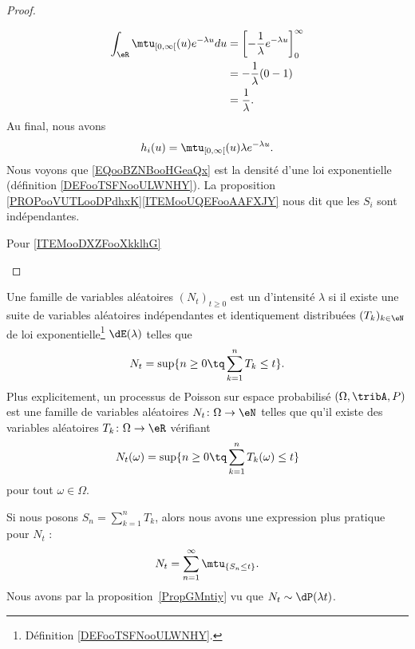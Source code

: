 \begin{proof}
\begin{subproof}
\begin{subequations}
\begin{align}
            \int_{\eR}\mtu_{\mathopen[ 0 , \infty \mathclose[}(u) e^{-\lambda u}du&=\left[ -\frac{1}{ \lambda } e^{-\lambda u} \right]_{0}^{\infty}\\
                    &=-\frac{1}{ \lambda }(0-1)\\
                    &=\frac{1}{ \lambda }.
        \end{align}
    \end{subequations}
    Au final, nous avons
    \begin{equation}        \label{EQooBZNBooHGeaQx}
        h_i(u)=\mtu_{\mathopen[ 0 , \infty \mathclose[}(u)\lambda  e^{-\lambda u}.
    \end{equation}
    \spitem[Conclusions]
    Nous voyons que \eqref{EQooBZNBooHGeaQx} est la densité d'une loi exponentielle (définition \ref{DEFooTSFNooULWNHY}). La proposition \ref{PROPooVUTLooDPdhxK}\ref{ITEMooUQEFooAAFXJY} nous dit que les \( S_i\) sont indépendantes.
    \end{subproof}


    \begin{center}
        Pour \ref{ITEMooDXZFooXkklhG}
    \end{center}
    

\end{proof}

\begin{definition}      \label{DEFooWXHEooEHQUJU}       
    Une famille de variables aléatoires \( (N_t)_{t\geq 0}\) est un  d'intensité \( \lambda\) si il existe une suite de variables aléatoires indépendantes et identiquement distribuées \( (T_k)_{k\in \eN}\) de loi exponentielle\footnote{Définition \ref{DEFooTSFNooULWNHY}.} \( \dE(\lambda)\) telles que
	\begin{equation}
		N_t=\sup\{ n\geq 0\tq \sum_{k=1}^nT_k\leq t \}.
	\end{equation}
    Plus explicitement, un processus de Poisson sur espace probabilisé \( (\Omega,\tribA,P)\) est une famille de variables aléatoires \( N_t\colon \Omega\to \eN\) telles que qu'il existe des variables aléatoires \( T_k\colon \Omega\to \eR\) vérifiant
    \begin{equation}
        N_t(\omega)=\sup\{ n\geq 0\tq \sum_{k=1}^nT_k(\omega)\leq t \}
    \end{equation}
    pour tout \( \omega\in\Omega\).
\end{definition}
Si nous posons \( S_n=\sum_{k=1}^nT_k\), alors nous avons une expression plus pratique pour \( N_t\) :
\begin{equation}
	N_t=\sum_{n=1}^{\infty}\mtu_{\{ S_n\leq t \}}.
\end{equation}
Nous avons par la proposition~\ref{PropGMntiy} vu que \( N_t\sim\dP(\lambda t)\).


